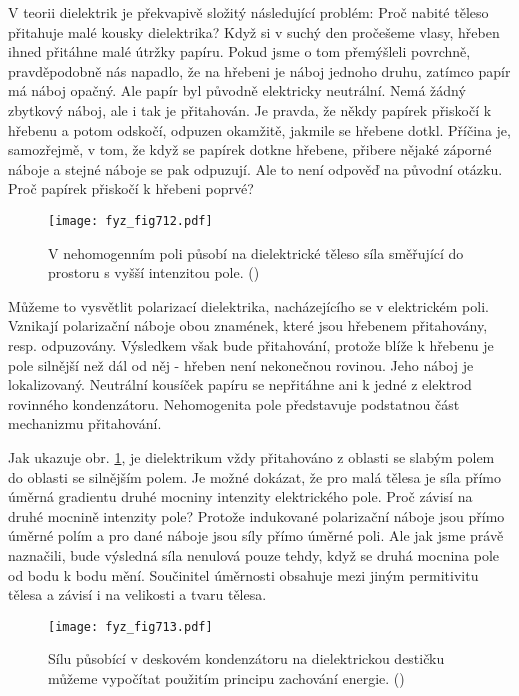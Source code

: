     V teorii dielektrik je překvapivě složitý následující problém: Proč nabité těleso přitahuje malé
    kousky dielektrika? Když si v suchý den pročešeme vlasy, hřeben ihned přitáhne malé útržky
    papíru. Pokud jsme o tom přemýšleli povrchně, pravděpodobně nás napadlo, že na hřebeni je náboj
    jednoho druhu, zatímco papír má náboj opačný. Ale papír byl původně elektricky neutrální. Nemá
    žádný zbytkový náboj, ale i tak je přitahován. Je pravda, že někdy papírek přiskočí k hřebenu a
    potom odskočí, odpuzen okamžitě, jakmile se hřebene dotkl. Příčina je, samozřejmě, v tom, že
    když se papírek dotkne hřebene, přibere nějaké záporné náboje a stejné náboje se pak odpuzují.
    Ale to není odpověď na původní otázku. Proč papírek přiskočí k hřebeni poprvé?

    \begin{figure}[ht!] %
      \centering
      \texttt{[image: fyz\_fig712.pdf]}
      \caption{V nehomogenním poli působí na dielektrické těleso síla směřující do prostoru s vyšší
              intenzitou pole. (\cite[s.~184]{Feynman02})}
      \label{fyz:fig712}
    \end{figure}

    Můžeme to vysvětlit polarizací dielektrika, nacházejícího se v elektrickém poli. Vznikají
    polarizační náboje obou znamének, které jsou hřebenem přitahovány, resp. odpuzovány. Výsledkem
    však bude přitahování, protože blíže k hřebenu je pole silnější než dál od něj - hřeben není
    nekonečnou rovinou. Jeho náboj je lokalizovaný. Neutrální kousíček papíru se nepřitáhne ani k
    jedné z elektrod rovinného kondenzátoru. Nehomogenita pole představuje podstatnou část
    mechanizmu přitahování.

    Jak ukazuje obr. \ref{fyz:fig712}, je dielektrikum vždy přitahováno z oblasti se slabým polem do
    oblasti se silnějším polem. Je možné dokázat, že pro malá tělesa je síla přímo úměrná gradientu
    druhé mocniny intenzity elektrického pole. Proč závisí na druhé mocnině intenzity pole? Protože
    indukované polarizační náboje jsou přímo úměrné polím a pro dané náboje jsou síly přímo úměrné
    poli. Ale jak jsme právě naznačili, bude výsledná síla nenulová pouze tehdy, když se druhá
    mocnina pole od bodu k bodu mění. Součinitel úměrnosti obsahuje mezi jiným permitivitu tělesa a
    závisí i na velikosti a tvaru tělesa.

    \begin{figure}[ht!] %
      \centering
      \texttt{[image: fyz\_fig713.pdf]}
      \caption{Sílu působící v deskovém kondenzátoru na dielektrickou destičku můžeme vypočítat
               použitím principu zachování energie. (\cite[s.~707]{Feynman02})}
      \label{fyz:fig713}
    \end{figure}

